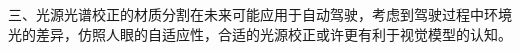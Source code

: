\documentclass[
    type = master, %
    degree = academic,        %
    decl-page,  %
  ]{njuthesis}
\begin{document}
三、光源光谱校正的材质分割在未来可能应用于自动驾驶，考虑到驾驶过程中环境光的差异，仿照人眼的自适应性，合适的光源校正或许更有利于视觉模型的认知。


% 
% 


\printbibliography[heading=bibintoc, title=参考文献]

\end{document}

